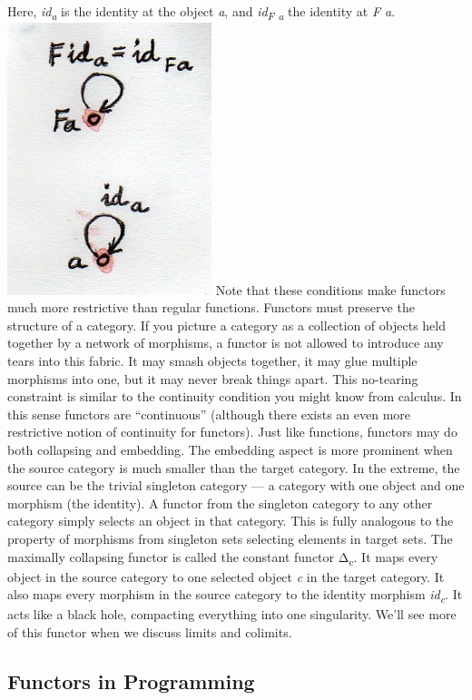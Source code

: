 Here, \emph{id\textsubscript{a}} is the identity at the object \emph{a},
and \emph{id\textsubscript{F a}} the identity at \emph{F a}.
\includegraphics[width=2.34375in]{images/functorid.jpg} Note that these
conditions make functors much more restrictive than regular functions.
Functors must preserve the structure of a category. If you picture a
category as a collection of objects held together by a network of
morphisms, a functor is not allowed to introduce any tears into this
fabric. It may smash objects together, it may glue multiple morphisms
into one, but it may never break things apart. This no-tearing
constraint is similar to the continuity condition you might know from
calculus. In this sense functors are ``continuous'' (although there
exists an even more restrictive notion of continuity for functors). Just
like functions, functors may do both collapsing and embedding. The
embedding aspect is more prominent when the source category is much
smaller than the target category. In the extreme, the source can be the
trivial singleton category --- a category with one object and one
morphism (the identity). A functor from the singleton category to any
other category simply selects an object in that category. This is fully
analogous to the property of morphisms from singleton sets selecting
elements in target sets. The maximally collapsing functor is called the
constant functor Δ\textsubscript{c}. It maps every object in the source
category to one selected object \emph{c} in the target category. It also
maps every morphism in the source category to the identity morphism
\emph{id\textsubscript{c}}. It acts like a black hole, compacting
everything into one singularity. We'll see more of this functor when we
discuss limits and colimits.

\subsection{Functors in Programming}\label{functors-in-programming}

